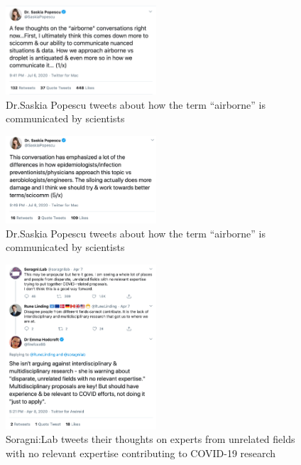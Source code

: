 \documentclass[acmsmall,authordraft]{acmart}
\begin{document}
\begin{figure}
  \includegraphics[width=0.5\textwidth]{Pictures/Appendix_Tweets/saskia popescu tweet2.png}
  \caption{Dr.Saskia Popescu tweets about how the term ``airborne'' is communicated by scientists}
  \label{saskia_popescu_tweet2}
\end{figure}

\begin{figure}
  \includegraphics[width=0.5\textwidth]{Pictures/Appendix_Tweets/saskia popescu tweet2 contd.png}
  \caption{Dr.Saskia Popescu tweets about how the term ``airborne'' is communicated by scientists}
  \label{saskia_popescu_tweet2_contd}
\end{figure}

\begin{figure}
  \includegraphics[width=0.5\textwidth]{Pictures/Appendix_Tweets/soragni lab tweet.png}
  \caption{Soragni:Lab tweets their thoughts on experts from unrelated fields with no relevant expertise contributing to COVID-19 research}
  \label{soragni_lab_tweet}
\end{figure}
\end{document}
